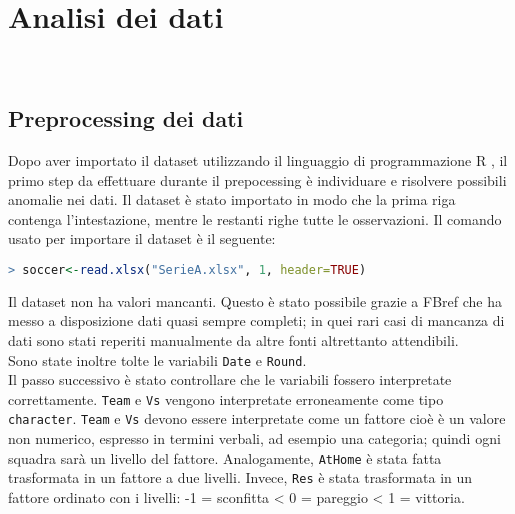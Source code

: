 
\chapter{Analisi dei dati}
\\


\section{Preprocessing dei dati}
Dopo aver importato il dataset utilizzando il linguaggio di programmazione R \autocite{R}, il primo step da effettuare durante il prepocessing è individuare e risolvere possibili anomalie nei dati.
Il dataset è stato importato in modo che la prima riga contenga l'intestazione, mentre le restanti righe tutte le osservazioni. Il comando usato per importare il dataset è il seguente:\\

\begin{lstlisting}[language=R]
> soccer<-read.xlsx("SerieA.xlsx", 1, header=TRUE)
\end{lstlisting}
\bigskip
Il dataset non ha valori mancanti. Questo è stato possibile grazie a FBref che ha messo a disposizione dati quasi sempre completi; in quei rari casi di mancanza di dati sono stati reperiti manualmente da altre fonti altrettanto attendibili.\\ 
Sono state inoltre tolte le variabili \texttt{Date} e \texttt{Round}.\\
Il passo successivo è stato controllare che le variabili fossero interpretate correttamente. \texttt{Team} e \texttt{Vs} vengono interpretate erroneamente come tipo \texttt{character}. \texttt{Team} e \texttt{Vs} devono essere interpretate come un fattore cioè è un valore non numerico, espresso in termini verbali, ad esempio una categoria; quindi ogni squadra sarà un livello del fattore. Analogamente, \texttt{AtHome} è stata fatta trasformata in un fattore a due livelli. Invece, \texttt{Res} è stata trasformata in un fattore ordinato con i livelli: -1 = sconfitta <  0 = pareggio < 1 = vittoria.


